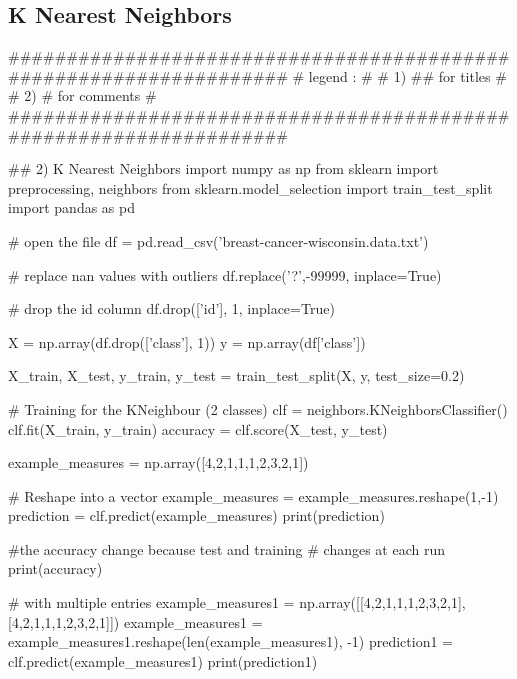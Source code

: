 \documentclass[11pt]{article}
\begin{document}
\subsection{K Nearest Neighbors}
\begin{python}
###################################################################
# legend :                                                        #
#         1) ## for titles                                        #
#         2) #  for comments                                      #
###################################################################   

## 2) K Nearest Neighbors
import numpy as np
from sklearn import preprocessing, neighbors
from sklearn.model_selection import train_test_split
import pandas as pd

# open the file
df = pd.read_csv('breast-cancer-wisconsin.data.txt')

# replace nan values with outliers
df.replace('?',-99999, inplace=True)

# drop the id column
df.drop(['id'], 1, inplace=True)

X = np.array(df.drop(['class'], 1))
y = np.array(df['class'])

X_train, X_test, y_train, y_test = train_test_split(X, y, 
                                                    test_size=0.2)

# Training for the KNeighbour (2 classes)
clf = neighbors.KNeighborsClassifier()
clf.fit(X_train, y_train)
accuracy = clf.score(X_test, y_test)

example_measures = np.array([4,2,1,1,1,2,3,2,1])

# Reshape into a vector
example_measures = example_measures.reshape(1,-1)
prediction = clf.predict(example_measures)
print(prediction)

#the accuracy change because test and training 
# changes at each run 
print(accuracy)

# with multiple entries
example_measures1 = np.array([[4,2,1,1,1,2,3,2,1],
                              [4,2,1,1,1,2,3,2,1]])
example_measures1 = example_measures1.reshape(len(example_measures1), -1)
prediction1 = clf.predict(example_measures1)
print(prediction1)
\end{python}{}
\clearpage
\end{document}
